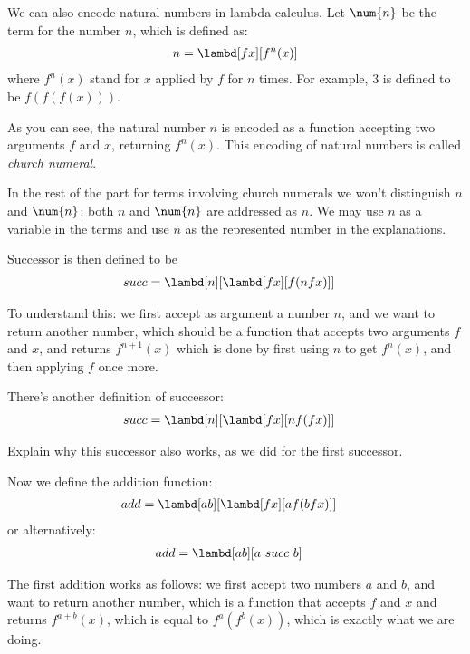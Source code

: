 \documentclass[../../../include/open-logic-section]{subfiles}
\begin{document}

We can also encode natural numbers in lambda calculus. Let
$\num{n}$ be the term for the number $n$, which is defined as:
\begin{align*}
  n &= \lambd[fx][f^n(x)]\\
\end{align*}
where $f^n(x)$ stand for $x$ applied by $f$ for $n$ times. For
example, $\num{3}$ is defined to be $f(f(f(x)))$. 

As you can see, the natural number $n$ is encoded as a function
accepting two arguments $f$ and $x$, returning $f^n(x)$. This encoding
of natural numbers is called \emph{church numeral}.

In the rest
of the part for terms involving church numerals we won't distinguish
$n$ and $\num{n}$; both $n$ and
$\num{n}$ are addressed as $n$. We may use $n$ as a variable in the
terms and use $n$ as the represented number in the explanations. 

Successor is then defined to be
\begin{align*}
  {succ} &= \lambd[{n}][\lambd[fx][f ({n} f x)]]
\end{align*}

To understand this: we first accept as argument a number ${n}$, and we want to return another number,
which should be a function that accepts
two arguments $f$ and $x$, and returns $f^{n+1}(x)$
which is done by first using ${n}$ to get $f^n(x)$, and then applying $f$ once more.

There's another definition of successor:
\begin{align*}
  {succ} &= \lambd[{n}][\lambd[fx][{n} f (f x)]]
\end{align*}

\begin{prob}
  Explain why this successor also works, as we did for the first successor.
\end{prob}

Now we define the addition function:
\begin{align*}
  {add} &= \lambd[{a}{b}][\lambd[fx][{a} f ({b} f x)]]
\end{align*}
or alternatively:
\begin{align*}
  {add} &= \lambd[{a}{b}][{a} ~ {succ} ~ {b}]
\end{align*}

The first addition works as follows: we first accept two numbers ${a}$ and
${b}$, and want to return another number, which is a function that accepts
$f$ and $x$ and returns $f^{a+b}(x)$, which is equal to
$f^{a}(f^{b}(x))$, which is exactly what we are doing.
\end{document}
